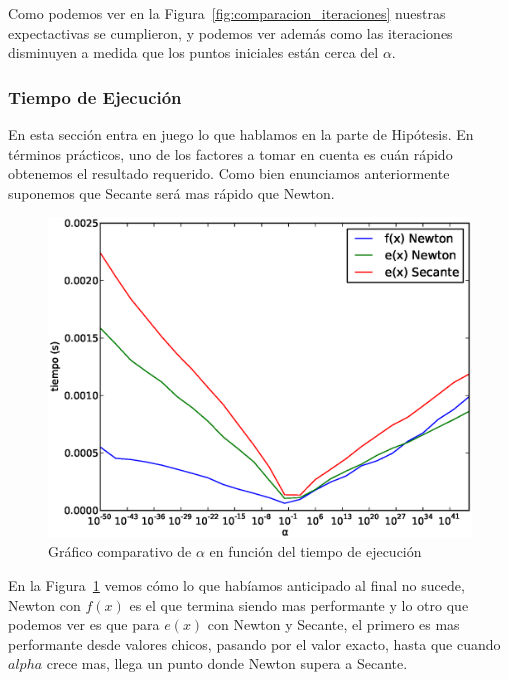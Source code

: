 Como podemos ver en la Figura~\ref{fig:comparacion_iteraciones} nuestras expectactivas se cumplieron, y podemos ver además como las iteraciones disminuyen a medida que los puntos iniciales están cerca del $\alpha$.


\subsubsection{Tiempo de Ejecución} %
\label{ssub:tiempo_de_ejecuci_n}

En esta sección entra en juego lo que hablamos en la parte de Hipótesis. En términos prácticos, uno de los factores a tomar en cuenta es cuán rápido obtenemos el resultado requerido. Como bien enunciamos anteriormente suponemos que Secante será mas rápido que Newton.\\

\begin{figure}[!htbp]
  \begin{center}
    \includegraphics[scale=0.5]{graficos/new/comparacion_tiempos.eps}
    \caption{\label{fig:comparacion_tiempos} Gráfico comparativo de $\alpha$ en función del tiempo de ejecución}
  \end{center}
\end{figure}

En la Figura~\ref{fig:comparacion_tiempos} vemos cómo lo que habíamos anticipado al final no sucede, Newton con $f(x)$ es el que termina siendo mas performante y lo otro que podemos ver es que para $e(x)$ con Newton y Secante, el primero es mas performante desde valores chicos, pasando por el valor exacto, hasta que cuando $alpha$ crece mas, llega un punto donde Newton supera a Secante.\\

